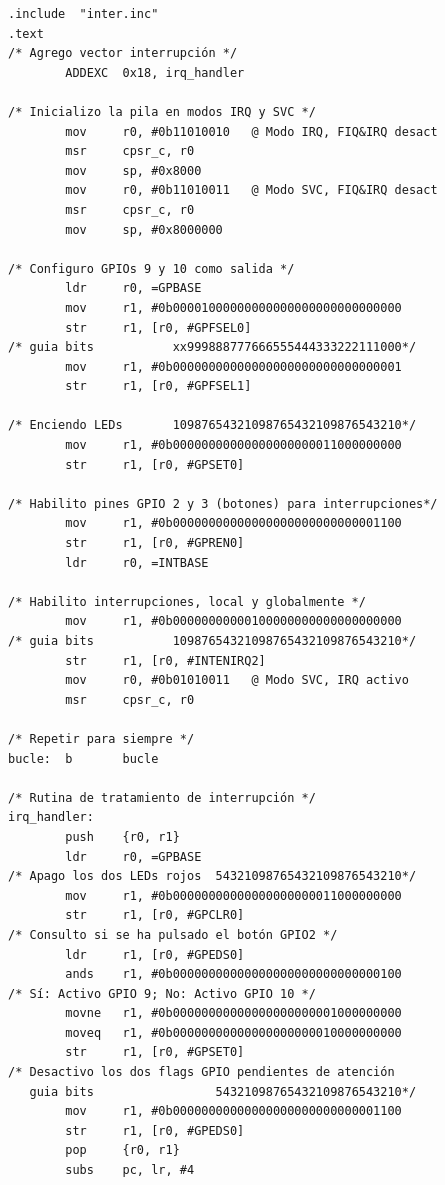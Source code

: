 \begin{lstlisting}[caption={inter3.s},label={lst:codigoPract5_3}]
        .include  "inter.inc"
.text
/* Agrego vector interrupción */
        ADDEXC  0x18, irq_handler

/* Inicializo la pila en modos IRQ y SVC */
        mov     r0, #0b11010010   @ Modo IRQ, FIQ&IRQ desact
        msr     cpsr_c, r0
        mov     sp, #0x8000
        mov     r0, #0b11010011   @ Modo SVC, FIQ&IRQ desact
        msr     cpsr_c, r0
        mov     sp, #0x8000000

/* Configuro GPIOs 9 y 10 como salida */
        ldr     r0, =GPBASE
        mov     r1, #0b00001000000000000000000000000000
        str     r1, [r0, #GPFSEL0]
/* guia bits           xx999888777666555444333222111000*/
        mov     r1, #0b00000000000000000000000000000001
        str     r1, [r0, #GPFSEL1]

/* Enciendo LEDs       10987654321098765432109876543210*/
        mov     r1, #0b00000000000000000000011000000000
        str     r1, [r0, #GPSET0]

/* Habilito pines GPIO 2 y 3 (botones) para interrupciones*/
        mov     r1, #0b00000000000000000000000000001100
        str     r1, [r0, #GPREN0]
        ldr     r0, =INTBASE

/* Habilito interrupciones, local y globalmente */
        mov     r1, #0b00000000000100000000000000000000
/* guia bits           10987654321098765432109876543210*/
        str     r1, [r0, #INTENIRQ2]
        mov     r0, #0b01010011   @ Modo SVC, IRQ activo
        msr     cpsr_c, r0

/* Repetir para siempre */
bucle:  b       bucle

/* Rutina de tratamiento de interrupción */
irq_handler:
        push    {r0, r1}
        ldr     r0, =GPBASE
/* Apago los dos LEDs rojos  54321098765432109876543210*/
        mov     r1, #0b00000000000000000000011000000000
        str     r1, [r0, #GPCLR0]
/* Consulto si se ha pulsado el botón GPIO2 */
        ldr     r1, [r0, #GPEDS0]
        ands    r1, #0b00000000000000000000000000000100
/* Sí: Activo GPIO 9; No: Activo GPIO 10 */
        movne   r1, #0b00000000000000000000001000000000
        moveq   r1, #0b00000000000000000000010000000000
        str     r1, [r0, #GPSET0]
/* Desactivo los dos flags GPIO pendientes de atención
   guia bits                 54321098765432109876543210*/
        mov     r1, #0b00000000000000000000000000001100
        str     r1, [r0, #GPEDS0]
        pop     {r0, r1}
        subs    pc, lr, #4
\end{lstlisting}

